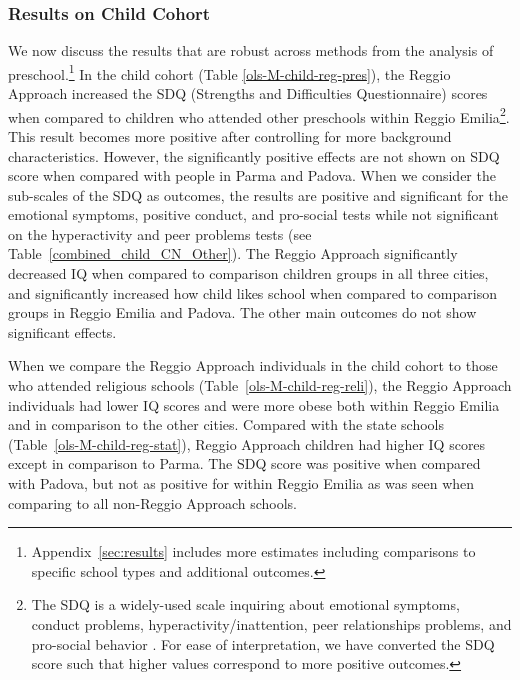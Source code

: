 \subsubsection{Results on Child Cohort}
We now discuss the results that are robust across methods from the analysis of preschool.\footnote{Appendix~\ref{sec:results} includes more estimates including comparisons to specific school types and additional outcomes.} In the child cohort (Table \ref{ols-M-child-reg-pres}), the Reggio Approach increased the SDQ (Strengths and Difficulties Questionnaire) scores when compared to children who attended other preschools within Reggio Emilia\footnote{The SDQ is a widely-used scale inquiring about emotional symptoms, conduct problems, hyperactivity/inattention, peer relationships problems, and pro-social behavior \citep{Goodman_1997_JCPP}. For ease of interpretation, we have converted the SDQ score such that higher values correspond to more positive outcomes.}. This result becomes more positive after controlling for more background characteristics. However, the significantly positive effects are not shown on SDQ score when compared with people in Parma and Padova. When we consider the sub-scales of the SDQ as outcomes, the results are positive and significant for the emotional symptoms, positive conduct, and pro-social tests while not significant on the hyperactivity and peer problems tests (see Table~\ref{combined_child_CN_Other}). The Reggio Approach significantly decreased IQ when compared to comparison children groups in all three cities, and significantly increased how child likes school when compared to comparison groups in Reggio Emilia and Padova. The other main outcomes do not show significant effects. 

When we compare the Reggio Approach individuals in the child cohort to those who attended religious schools (Table~\ref{ols-M-child-reg-reli}), the Reggio Approach individuals had lower IQ scores and were more obese both within Reggio Emilia and in comparison to the other cities. Compared with the state schools (Table~\ref{ols-M-child-reg-stat}), Reggio Approach children had higher IQ scores except in comparison to Parma. The SDQ score was positive when compared with Padova, but not as positive for within Reggio Emilia as was seen when comparing to all non-Reggio Approach schools.

